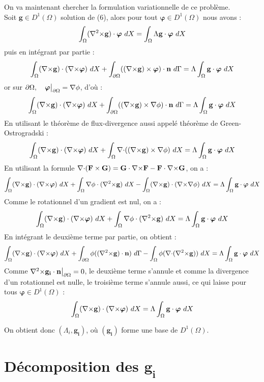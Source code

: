 On va maintenant chercher la formulation variationnelle de ce problème.\\
Soit $\mathbf{g}\in D^1(\Omega)$ solution de (6), alors pour tout $\bm{\varphi}\in D^1(\Omega)$ nous avons :
\[ \int_\Omega ({\nabla^2\times} \mathbf{g})\cdot\bm{\varphi}\ dX = \int_\Omega\Lambda \mathbf{g}\cdot\bm{\varphi}\ dX \]
puis en intégrant par partie :
\[ \int_\Omega ({\nabla\times} \mathbf{g})\cdot({\nabla\times}\bm{\varphi})\ dX + \int_{\partial\Omega} (({\nabla\times} \mathbf{g})\times \bm{\varphi})\cdot \mathbf{n}\ d\Gamma = \Lambda\int_\Omega \mathbf{g}\cdot\bm{\varphi}\ dX \]
or sur $\partial\Omega,\quad \bm{\varphi}{\big\rvert_{\partial\Omega}}={\nabla}\phi$, d'où :
\[ \int_\Omega ({\nabla\times} \mathbf{g})\cdot({\nabla\times}\bm{\varphi})\ dX + \int_{\partial\Omega} (({\nabla\times} \mathbf{g})\times {\nabla}\phi)\cdot \mathbf{n}\ d\Gamma = \Lambda\int_\Omega \mathbf{g}\cdot\bm{\varphi}\ dX \]
En utilisant le théorème de flux-divergence aussi appelé théorème de Green-Ostrogradski :
\[ \int_\Omega ({\nabla\times} \mathbf{g})\cdot({\nabla\times}\bm{\varphi})\ dX + \int_\Omega {\nabla\cdot}(({\nabla\times} \mathbf{g})\times {\nabla}\phi)\ dX = \Lambda\int_\Omega \mathbf{g}\cdot\bm{\varphi}\ dX \]
En utilisant la formule ${\nabla\cdot}(\mathbf{F}\times \mathbf{G}) = \mathbf{G}\cdot {\nabla\times} \mathbf{F} - \mathbf{F}\cdot {\nabla\times} \mathbf{G}$, on a :
\[ \int_\Omega (\rot \mathbf{g})\cdot(\rot\bm{\varphi})\ dX + \int_\Omega \grad\phi\cdot(\rott \mathbf{g})\ dX -\int_\Omega (\rot \mathbf{g})\cdot (\rot\grad\phi)\ dX  = \Lambda\int_\Omega \mathbf{g}\cdot\bm{\varphi}\ dX \]
Comme le rotationnel d'un gradient est nul, on a :
\[ \int_\Omega ({\nabla\times} \mathbf{g})\cdot({\nabla\times}\bm{\varphi})\ dX + \int_\Omega {\nabla}\phi\cdot({\nabla^2\times} \mathbf{g})\ dX  = \Lambda\int_\Omega \mathbf{g}\cdot\bm{\varphi}\ dX \]
En intégrant le deuxième terme par partie, on obtient :
\[ \int_\Omega ({\nabla\times} \mathbf{g})\cdot({\nabla\times}\bm{\varphi})\ dX + \int_{\partial\Omega} \phi(({\nabla^2\times} \mathbf{g})\cdot \mathbf{n})\ d\Gamma - \int_\Omega \phi({\nabla\cdot}({\nabla^2\times} \mathbf{g}))\ dX  = \Lambda\int_\Omega \mathbf{g}\cdot\bm{\varphi}\ dX \]
Comme ${\nabla^2\times}  \mathbf{g_i}\cdot \mathbf{n}{\big\rvert_{\partial\Omega}} = 0$, le deuxième terme s'annule et comme la divergence d'un rotationnel est nulle, le troisième terme s'annule aussi, ce qui laisse pour tous $\bm{\varphi}\in D^1(\Omega)$ :
\begin{equation}\label{fveigen}
\int_\Omega ({\nabla\times} \mathbf{g})\cdot({\nabla\times}\bm{\varphi})\ dX = \Lambda\int_\Omega \mathbf{g}\cdot\bm{\varphi}\ dX
\end{equation}

On obtient donc $(\Lambda_i,\mathbf{g_i})$, où $(\mathbf{g_i})$ forme une base de $D^1(\Omega)$.
\section{Décomposition des $\mathbf{g_i}$}
\label{decomp}

